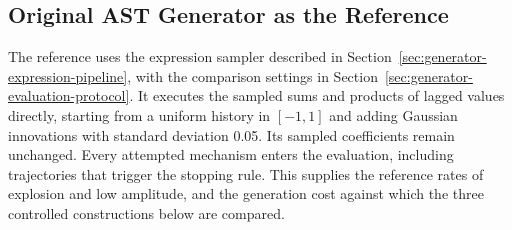 \subsection{Original AST Generator as the Reference}
\label{sec:implemented-original-baseline}

The reference uses the expression sampler described in
Section~\ref{sec:generator-expression-pipeline}, with the comparison settings
in Section~\ref{sec:generator-evaluation-protocol}.
It executes the sampled sums and products of lagged values directly,
starting from a uniform history in $[-1,1]$ and adding Gaussian innovations
with standard deviation 0.05. Its sampled coefficients remain unchanged.
Every attempted mechanism enters the evaluation, including trajectories
that trigger the stopping rule. This supplies the reference rates of
explosion and low amplitude, and the generation cost against which the
three controlled constructions below are compared.
